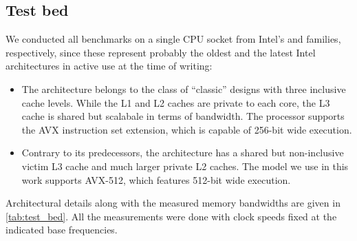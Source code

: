\subsection{Test bed}
We conducted all benchmarks on a single CPU socket from Intel's \IVB and  \SKX families, respectively, since these  represent probably the oldest and the latest Intel architectures in active use at the time of writing:
\begin{itemize}
\item The \Intel \IVB architecture belongs to the class of ``classic'' designs with three inclusive cache levels. While the L1 and L2 caches are private to each core, the L3 cache is shared but scalabale in terms of bandwidth. The processor supports the AVX instruction set extension, which is capable of 256-bit wide \SIMD execution.
\item Contrary to its predecessors, the \Intel \SKX architecture has a shared but non-inclusive victim L3 cache and much larger private L2 caches. The model we use in this work supports AVX-512, which features 512-bit wide \SIMD execution.
 
\end{itemize}
Architectural details along with the measured memory bandwidths are given in \cref{tab:test_bed}. 
All the measurements were done with \CPU clock speeds fixed at the indicated base frequencies.
